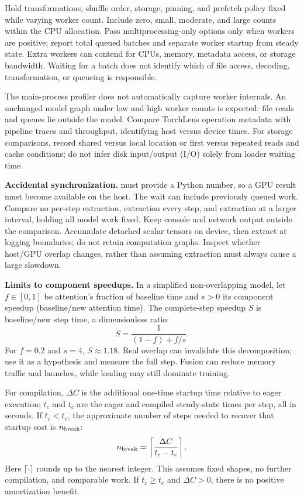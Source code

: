 \documentclass[11pt,a4paper,oneside]{report}
\newcommand{\code}[1]{\texttt{\detokenize{#1}}}
\begin{document}
Hold transformations, shuffle order, storage, pinning, and prefetch policy
fixed while varying worker count. Include zero, small, moderate, and large
counts within the CPU allocation. Pass multiprocessing-only options only when
workers are positive; report total queued batches and separate worker startup
from steady state. Extra workers can contend for CPUs, memory, metadata access,
or storage bandwidth. Waiting for a batch does not identify which of file
access, decoding, transformation, or queueing is responsible.

The main-process profiler does not automatically capture worker internals.
An unchanged model graph under low and high worker counts is expected: file
reads and queues lie outside the model. Compare TorchLens operation metadata
with pipeline traces and throughput, identifying host versus device times.
For storage comparisons, record shared versus local location or first versus
repeated reads and cache conditions; do not infer disk input/output (I/O) solely from
loader waiting time.

\textbf{Accidental synchronization.} \code{loss.item()} must provide a Python
number, so a GPU result must become available on the host. The wait can include
previously queued work. Compare no per-step extraction, extraction every step,
and extraction at a larger interval, holding all model work fixed. Keep console
and network output outside the comparison. Accumulate detached scalar tensors
on device, then extract at logging boundaries; do not retain computation graphs.
Inspect whether host/GPU overlap changes, rather than assuming extraction must
always cause a large slowdown.

\textbf{Limits to component speedups.} In a simplified non-overlapping model,
let $f\in[0,1]$ be attention's fraction of baseline time and $s>0$ its
component speedup (baseline/new attention time). The complete-step speedup
$S$ is baseline/new step time, a dimensionless ratio:
\begin{equation}
 S=\frac{1}{(1-f)+f/s}.
\end{equation}
For $f=0.2$ and $s=4$, $S\approx1.18$. Real overlap can invalidate this
decomposition; use it as a hypothesis and measure the full step. Fusion can
reduce memory traffic and launches, while loading may still dominate training.

For compilation, $\Delta C$ is the additional one-time startup time relative
to eager execution; $t_e$ and $t_c$ are the eager and compiled steady-state
times per step, all in seconds. If $t_c<t_e$, the approximate number of steps
needed to recover that startup cost is $n_{\rm break}$:
\begin{equation}
 n_{\rm break}=\left\lceil\frac{\Delta C}{t_e-t_c}\right\rceil.
\end{equation}
Here $\lceil\cdot\rceil$ rounds up to the nearest integer. This assumes fixed
shapes, no further compilation, and comparable work.
If $t_c\geq t_e$ and $\Delta C>0$, there is no positive amortization benefit.
\end{document}
